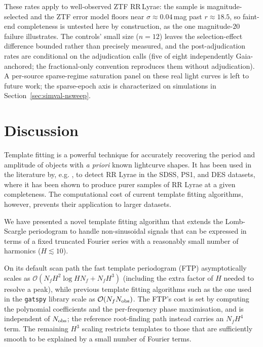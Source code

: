 \documentclass[apj]{emulateapj}
\newcommand{\bigO}{\mathcal{O}}
\begin{document}
These rates apply to well-observed ZTF RR\,Lyrae: the sample is
magnitude-selected and the ZTF error model floors near $\sigma\approx0.04$\,mag
past $r\approx18.5$, so faint-end completeness is untested here by construction,
as the one magnitude-$20$ failure illustrates.  The controls' small size
($n=12$) leaves the selection-effect difference bounded rather than precisely
measured, and the post-adjudication rates are conditional on the adjudication
calls (five of eight independently Gaia-anchored; the fractional-only
convention reproduces them without adjudication).  A per-source sparse-regime
saturation panel on these real light curves is left to future work; the
sparse-epoch axis is characterized on simulations in
Section~\ref{sec:simval-nsweep}.

\section{Discussion}\label{sec:discussion}

Template fitting is a powerful technique for accurately recovering
the period and amplitude of objects with \emph{a priori} known
lightcurve shapes. It has been used in the literature by, e.g.
\cite{Stringer_et_al_2019,Sesar_etal_2016, Sesar_etal_2010}, to detect RR Lyrae in the
SDSS, PS1, and DES datasets, where it has been shown to produce purer
samples of RR Lyrae at a given completeness. The computational
cost of current template fitting algorithms, however, prevents their
application to larger datasets.

We have presented a novel template fitting algorithm that extends
the Lomb-Scargle periodogram \citep{Lomb_1976,Scargle_1982,Barning_1963,Vanicek_1971}
to handle non-sinusoidal signals that can be expressed in terms of
a fixed truncated Fourier series with a reasonably small number of harmonics
($H\lesssim 10$).

On its default scan path the fast template periodogram (FTP) asymptotically scales as
$\bigO(N_fH^2\log HN_f + N_fH^3)$ (including the extra factor of $H$ needed to resolve a peak),
while previous template fitting algorithms such as the one used in the \texttt{gatspy} library
\citep{gatspy} scale as $\bigO(N_fN_{\rm obs})$. The FTP's cost is set by computing the polynomial
coefficients and the per-frequency phase maximisation, and is independent of $N_{\rm obs}$; the
reference root-finding path instead carries an $N_fH^4$ term.
The remaining $H^3$ scaling restricts templates to those that are
sufficiently smooth to be explained by a small number of Fourier terms.
\end{document}
